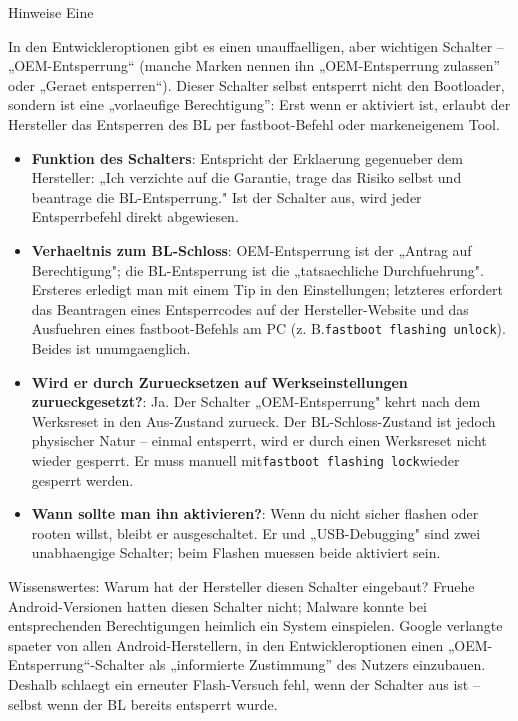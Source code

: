 \begin{tcbwarn}{Hinweise}
Eine

\end{tcbwarn}


In den Entwickleroptionen gibt es einen unauffaelligen, aber wichtigen Schalter – „OEM-Entsperrung“ (manche Marken nennen ihn „OEM-Entsperrung zulassen” oder „Geraet entsperren“). Dieser Schalter selbst entsperrt nicht den Bootloader, sondern ist eine „vorlaeufige Berechtigung”: Erst wenn er aktiviert ist, erlaubt der Hersteller das Entsperren des BL per fastboot-Befehl oder markeneigenem Tool.

\begin{itemize}
  \item \textbf{Funktion des Schalters}: Entspricht der Erklaerung gegenueber dem Hersteller: „Ich verzichte auf die Garantie, trage das Risiko selbst und beantrage die BL-Entsperrung." Ist der Schalter aus, wird jeder Entsperrbefehl direkt abgewiesen.
  \item \textbf{Verhaeltnis zum BL-Schloss}: OEM-Entsperrung ist der „Antrag auf Berechtigung"; die BL-Entsperrung ist die „tatsaechliche Durchfuehrung". Ersteres erledigt man mit einem Tip in den Einstellungen; letzteres erfordert das Beantragen eines Entsperrcodes auf der Hersteller-Website und das Ausfuehren eines fastboot-Befehls am PC (z. B.\texttt{fastboot flashing unlock}). Beides ist unumgaenglich.
  \item \textbf{Wird er durch Zuruecksetzen auf Werkseinstellungen zurueckgesetzt?}: Ja. Der Schalter „OEM-Entsperrung" kehrt nach dem Werksreset in den Aus-Zustand zurueck. Der BL-Schloss-Zustand ist jedoch physischer Natur – einmal entsperrt, wird er durch einen Werksreset nicht wieder gesperrt. Er muss manuell mit\texttt{fastboot flashing lock}wieder gesperrt werden.
  \item \textbf{Wann sollte man ihn aktivieren?}: Wenn du nicht sicher flashen oder rooten willst, bleibt er ausgeschaltet. Er und „USB-Debugging" sind zwei unabhaengige Schalter; beim Flashen muessen beide aktiviert sein.
\end{itemize}

\begin{tcbinfo}{Wissenswertes: Warum hat der Hersteller diesen Schalter eingebaut?}
Fruehe Android-Versionen hatten diesen Schalter nicht; Malware konnte bei entsprechenden Berechtigungen heimlich ein System einspielen. Google verlangte spaeter von allen Android-Herstellern, in den Entwickleroptionen einen „OEM-Entsperrung“-Schalter als „informierte Zustimmung” des Nutzers einzubauen. Deshalb schlaegt ein erneuter Flash-Versuch fehl, wenn der Schalter aus ist – selbst wenn der BL bereits entsperrt wurde.

\end{tcbinfo}

